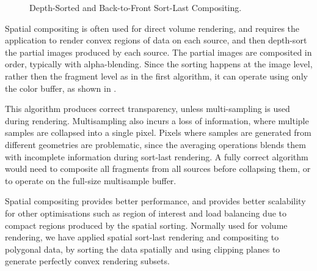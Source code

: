 \begin{figure}[h!t]\center
  \hfil
  \caption{Depth-Sorted and Back-to-Front Sort-Last Compositing.}
\end{figure}

Spatial compositing is often used for direct volume rendering, and requires the
application to render convex regions of data on each source, and then depth-sort
the partial images produced by each source. The partial images are composited in
order, typically with alpha-blending. Since the sorting happens at the image
level, rather then the fragment level as in the first algorithm, it can operate
using only the color buffer, as shown in .

This algorithm produces correct transparency, unless multi-sampling is used
during rendering. Multisampling also incurs a loss of information, where
multiple samples are collapsed into a single pixel. Pixels where samples are
generated from different geometries are problematic, since the averaging
operations blends them with incomplete information during sort-last rendering.
A fully correct algorithm would need to composite all fragments from all
sources before collapsing them, or to operate on the full-size multisample
buffer.

Spatial compositing provides better performance, and provides better
scalability for other optimisations such as region of interest and load
balancing due to compact regions produced by the spatial sorting. Normally used
for volume rendering, we have applied spatial sort-last rendering and
compositing to polygonal data, by sorting the data spatially and using clipping
planes to generate perfectly convex rendering subsets.

